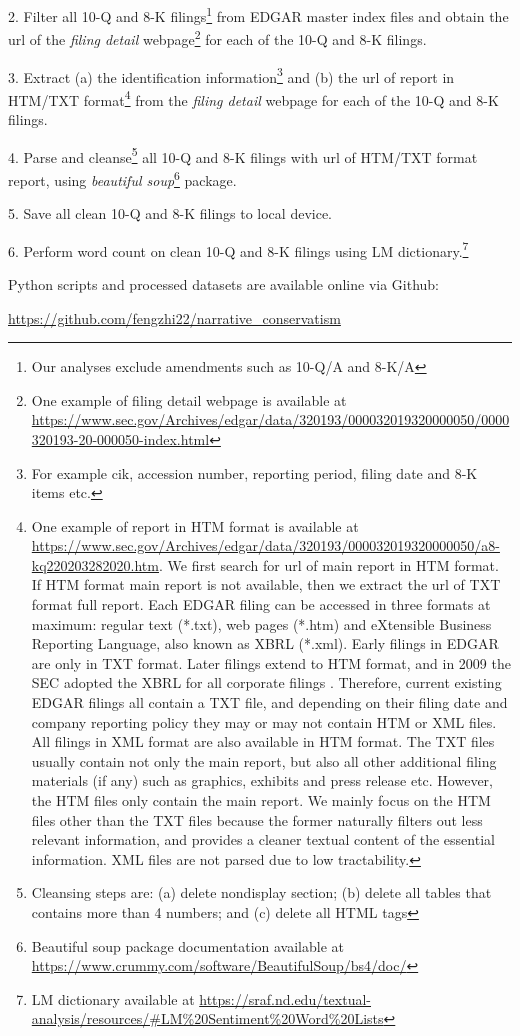 2. Filter all 10-Q and 8-K filings\footnote{Our analyses exclude amendments such as 10-Q/A and 8-K/A} from EDGAR master index files and obtain the url of the \textit{filing detail} webpage\footnote{One example of filing detail webpage is available at \url{https://www.sec.gov/Archives/edgar/data/320193/000032019320000050/0000320193-20-000050-index.html}} for each of the 10-Q and 8-K filings. 

3. Extract (a) the identification information\footnote{For example cik, accession number, reporting period, filing date and 8-K items etc.} and (b) the url of report in HTM/TXT format\footnote{One example of report in HTM format is available at \url{https://www.sec.gov/Archives/edgar/data/320193/000032019320000050/a8-kq220203282020.htm}. We first search for url of main report in HTM format. If HTM format main report is not available, then we extract the url of TXT format full report. Each EDGAR filing can be accessed in three formats at maximum: regular text (*.txt), web pages (*.htm) and eXtensible Business Reporting Language, also known as XBRL (*.xml). Early filings in EDGAR are only in TXT format. Later filings extend to HTM format, and in 2009 the SEC adopted the XBRL for all corporate filings \cite{secFinalRuleInteractive2009}. Therefore, current existing EDGAR filings all contain a TXT file, and depending on their filing date and company reporting policy they may or may not contain HTM or XML files. All filings in XML format are also available in HTM format. The TXT files usually contain not only the main report, but also all other additional filing materials (if any) such as graphics, exhibits and press release etc. However, the HTM files only contain the main report. We mainly focus on the HTM files other than the TXT files because the former naturally filters out less relevant information, and provides a cleaner textual content of the essential information. XML files are not parsed due to low tractability. } from the \textit{filing detail} webpage for each of the 10-Q and 8-K filings. 

4. Parse and cleanse\footnote{Cleansing steps are: (a) delete nondisplay section; (b) delete all tables that contains more than 4 numbers; and (c) delete all HTML tags} all 10-Q and 8-K filings with url of HTM/TXT format report, using \textit{beautiful soup}\footnote{Beautiful soup package documentation available at \url{https://www.crummy.com/software/BeautifulSoup/bs4/doc/}} package. 

5. Save all clean 10-Q and 8-K filings to local device. 

6. Perform word count on clean 10-Q and 8-K filings using LM dictionary.\footnote{LM dictionary available at \url{https://sraf.nd.edu/textual-analysis/resources/\#LM\%20Sentiment\%20Word\%20Lists}}


Python scripts and processed datasets are available online via Github:

\url{https://github.com/fengzhi22/narrative_conservatism}